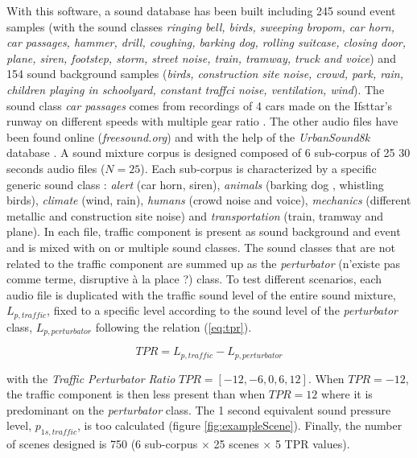\documentclass[twocolumn,a4paper,10pt]{article}
\begin{document}
With this software, a sound database has been built including 245 sound event samples (with the sound classes \textit{ringing bell, birds, sweeping bropom, car horn, car passages, hammer, drill, coughing, barking dog, rolling suitcase, closing door, plane, siren, footstep, storm, street noise, train, tramway, truck and voice}) and 154 sound background samples (\textit{birds, construction site noise, crowd, park, rain, children playing in schoolyard, constant traffci noise, ventilation, wind}). The sound class \textit{car passages} comes from recordings of 4 cars made on the Ifsttar's runway on different speeds with multiple gear ratio \cite{gloaguen_creation_2017}. The other audio files have been found online (\textit{freesound.org}) and with the help of the \textit{UrbanSound8k} database \cite{salamon_dataset_nodate}. A sound mixture corpus is designed composed of 6 sub-corpus of 25 30 seconds audio files ($N = 25$). Each sub-corpus is characterized by a specific generic sound class : \textit{alert} (car horn, siren), \textit{animals} (barking dog , whistling birds), \textit{climate} (wind, rain), \textit{humans} (crowd noise and voice), \textit{mechanics} (different metallic and construction site noise) and \textit{transportation} (train, tramway and plane). In each file, traffic component is present as sound background and event and is mixed with on or multiple sound classes. The sound classes that are not related to the traffic component are summed up as the \textit{perturbator} (n'existe pas comme terme, disruptive à la place ?) class. To test different scenarios, each audio file is duplicated with the traffic sound level of the entire sound mixture, $L_{p,traffic}$, fixed to a specific level according to the sound level of the \textit{perturbator} class, $L_{p,perturbator}$ following the relation (\ref{eq:tpr}). 

\begin{equation}\label{eq:tpr}
TPR = L_{p,traffic}-L_{p,perturbator}
\end{equation}

with the \textit{Traffic Perturbator Ratio} $TPR = \left[-12, -6, 0, 6, 12\right]$. When $TPR = -12$, the traffic component is then less present than when $TPR = 12$ where it is predominant on the \textit{perturbator} class. The 1 second equivalent sound pressure level, $p_{1s,traffic}$, is too calculated (figure \ref{fig:exampleScene}). Finally, the number of scenes designed is 750 (6 sub-corpus $\times$ 25 scenes $\times$  5 TPR values). 
\end{document}
